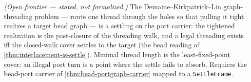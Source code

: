 \begin{theorem}\label{thm:bead-threading-closed-walk}\notready{}
\emph{(Open frontier --- stated, not formalized.)} The Demaine--Kirkpatrick--Lin
graph-threading problem --- route one thread through the holes so that pulling it tight
realizes a target bead graph --- is a settling on the port carrier: the tightened
realization is the past-closure of the threading walk, and a legal threading exists iff the
closed-walk cover settles to the target (the bead reading of
\cref{thm:interlacement-is-settle}). Minimal thread length is the least-fixed-point cover;
an illegal port turn is a point where the settle fails to absorb. Requires the bead-port
carrier of \cref{thm:bead-portgraph-carrier} mapped to a \texttt{SettleFrame}.
\end{theorem}
